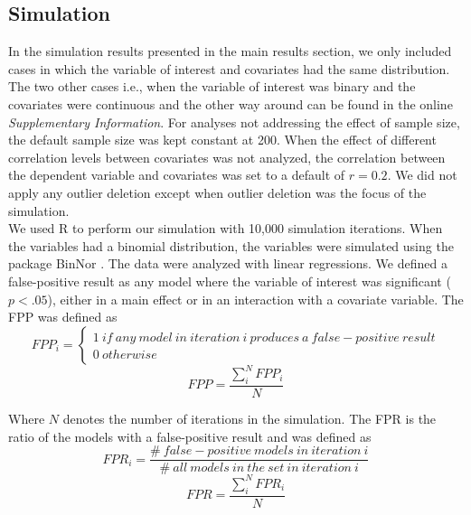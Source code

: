 \subsection{Simulation}
In the simulation results presented in the main results section, we only included cases in which the variable of interest and covariates had the same distribution. The two other cases i.e., when the variable of interest was binary and the covariates were continuous and the other way around can be found in the online \textit{Supplementary Information}. For analyses not addressing the effect of sample size, the default sample size was kept constant at 200. When the effect of different correlation levels between covariates was not analyzed, the correlation between the dependent variable and covariates was set to a default of $r=0.2$. We did not apply any outlier deletion except when outlier deletion was the focus of the simulation.\\
We used R \citep{Team2018} to perform our simulation with 10,000 simulation iterations. When the variables had a binomial distribution, the variables were simulated using the package BinNor \citep{Demirtas2014}. The data were analyzed with linear regressions. We defined a false-positive result as any model where the variable of interest was significant ($p < .05$), either in a main effect or in an interaction with a covariate variable. The FPP was defined as \\

\[FPP_i=\left. \left\{\begin{array}{c}
1\ if\ any\ model\ in\ iteration\ i\ produces\ a\ false-positive\ result \\ 
0\ otherwise\  \end{array}
\right.\] 
\[FPP=\frac{\sum_{i}^{N}{FPP_i}}{N}\] 

Where  $N$ denotes the number of iterations in the simulation. The FPR is the ratio of the models with a false-positive result and was defined as \\

\[FPR_i=\frac{\#\ false-positive\ models\ in\ iteration\ i}{\#\ all\ models\ in\ the\ set\ in\ iteration\ i}\] 
\[FPR=\frac{\sum_{i}^{N}{FPR_i}}{N}\] 




